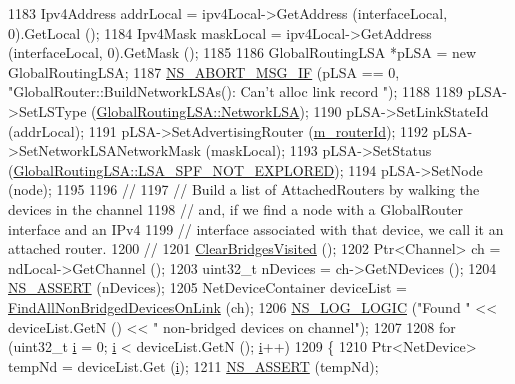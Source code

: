 \begin{DoxyCode}
1183       Ipv4Address addrLocal = ipv4Local->GetAddress (interfaceLocal, 0).GetLocal ();
1184       Ipv4Mask maskLocal = ipv4Local->GetAddress (interfaceLocal, 0).GetMask ();
1185 
1186       GlobalRoutingLSA *pLSA = \textcolor{keyword}{new} GlobalRoutingLSA;
1187       \hyperlink{group__fatal_ga6653324225bc139e46deea177614ceee}{NS\_ABORT\_MSG\_IF} (pLSA == 0, \textcolor{stringliteral}{"GlobalRouter::BuildNetworkLSAs(): Can't alloc link record
      "});
1188 
1189       pLSA->SetLSType (\hyperlink{classns3_1_1GlobalRoutingLSA_a34eb53a1ed37c877923b74d671224fdeab37398976cdc8ddd08e1428a4700b5b4}{GlobalRoutingLSA::NetworkLSA});
1190       pLSA->SetLinkStateId (addrLocal);
1191       pLSA->SetAdvertisingRouter (\hyperlink{classns3_1_1GlobalRouter_aa107123583f6b2b68c61666a029b4270}{m\_routerId});
1192       pLSA->SetNetworkLSANetworkMask (maskLocal);
1193       pLSA->SetStatus (\hyperlink{classns3_1_1GlobalRoutingLSA_a18bf63da580856fe1cc158aa855af1bda0d9a91161488cead75d479293fd05a94}{GlobalRoutingLSA::LSA\_SPF\_NOT\_EXPLORED});
1194       pLSA->SetNode (node);
1195 
1196       \textcolor{comment}{//}
1197       \textcolor{comment}{// Build a list of AttachedRouters by walking the devices in the channel}
1198       \textcolor{comment}{// and, if we find a node with a GlobalRouter interface and an IPv4 }
1199       \textcolor{comment}{// interface associated with that device, we call it an attached router.}
1200       \textcolor{comment}{//}
1201       \hyperlink{classns3_1_1GlobalRouter_a2519d9ebeb7425ffe4569c6ed0eaf4cf}{ClearBridgesVisited} ();
1202       Ptr<Channel> ch = ndLocal->GetChannel ();
1203       uint32\_t nDevices = ch->GetNDevices ();
1204       \hyperlink{assert_8h_a6dccdb0de9b252f60088ce281c49d052}{NS\_ASSERT} (nDevices);
1205       NetDeviceContainer deviceList = \hyperlink{classns3_1_1GlobalRouter_af1fc3edcc4d14d9344f3b94617da8e85}{FindAllNonBridgedDevicesOnLink} (ch);
1206       \hyperlink{group__logging_ga88acd260151caf2db9c0fc84997f45ce}{NS\_LOG\_LOGIC} (\textcolor{stringliteral}{"Found "} << deviceList.GetN () << \textcolor{stringliteral}{" non-bridged devices on channel"});
1207 
1208       \textcolor{keywordflow}{for} (uint32\_t \hyperlink{bernuolliDistribution_8m_a6f6ccfcf58b31cb6412107d9d5281426}{i} = 0; \hyperlink{bernuolliDistribution_8m_a6f6ccfcf58b31cb6412107d9d5281426}{i} < deviceList.GetN (); \hyperlink{bernuolliDistribution_8m_a6f6ccfcf58b31cb6412107d9d5281426}{i}++)
1209         \{
1210           Ptr<NetDevice> tempNd = deviceList.Get (\hyperlink{bernuolliDistribution_8m_a6f6ccfcf58b31cb6412107d9d5281426}{i});
1211           \hyperlink{assert_8h_a6dccdb0de9b252f60088ce281c49d052}{NS\_ASSERT} (tempNd);

\end{DoxyCode}
